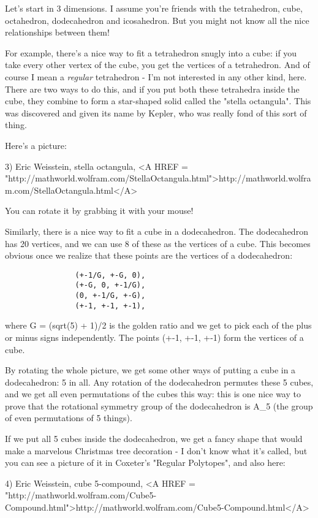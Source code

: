 Let's start in 3 dimensions.  I assume you're friends with the
tetrahedron, cube, octahedron, dodecahedron and icosahedron.  But you
might not know all the nice relationships between them!  

For example, there's a nice way to fit a tetrahedron snugly into a cube:
if you take every other vertex of the cube, you get the vertices of a
tetrahedron.  And of course I mean a \emph{regular} tetrahedron - I'm not
interested in any other kind, here.  There are two ways to do this, and
if you put both these tetrahedra inside the cube, they combine to form a
star-shaped solid called the "stella octangula".  This was
discovered and given its name by Kepler, who was really fond of this
sort of thing.

Here's a picture:

3) Eric Weisstein, stella octangula, 
<A HREF = "http://mathworld.wolfram.com/StellaOctangula.html">http://mathworld.wolfram.com/StellaOctangula.html</A>

You can rotate it by grabbing it with your mouse!

Similarly, there is a nice way to fit a cube in a dodecahedron.  The
dodecahedron has 20 vertices, and we can use 8 of these as the vertices
of a cube.  This becomes obvious once we realize that these points are
the vertices of a dodecahedron:

\begin{verbatim}
                (+-1/G, +-G, 0),
                (+-G, 0, +-1/G),
                (0, +-1/G, +-G),
                (+-1, +-1, +-1),
\end{verbatim}
    
where G = (sqrt(5) + 1)/2 is the golden ratio and we get to pick each of
the plus or minus signs independently.  The points (+-1, +-1, +-1) form
the vertices of a cube.  

By rotating the whole picture, we get some other ways of putting a cube
in a dodecahedron: 5 in all.  Any rotation of the dodecahedron permutes
these 5 cubes, and we get all even permutations of the cubes this way:
this is one nice way to prove that the rotational symmetry group of the
dodecahedron is A_{5} (the group of even permutations of 5 things).

If we put all 5 cubes inside the dodecahedron, we get a fancy shape
that would make a marvelous Christmas tree decoration - I don't know 
what it's called, but you can see a picture of it in Coxeter's "Regular
Polytopes", and also here:

4) Eric Weisstein, cube 5-compound, 
<A HREF = "http://mathworld.wolfram.com/Cube5-Compound.html">http://mathworld.wolfram.com/Cube5-Compound.html</A>

